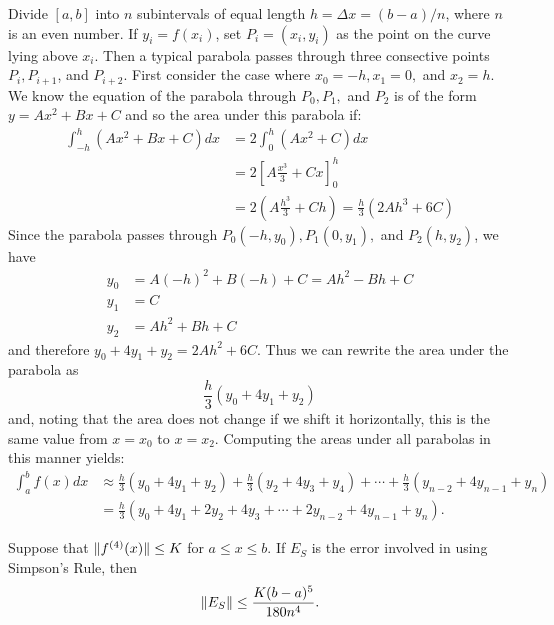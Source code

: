 \documentclass[a4paper,11pt]{article}
\begin{document}
\begin{outline}
    \begin{justification}
      Divide \([a,b]\) into \(n\) subintervals of equal length \(h = \Delta{x} = (b-a)/n\), where \(n\) is an even number.
      If \(y_i = f(x_i)\), set \(P_i = (x_i, y_i)\) as the point on the curve lying above \(x_i\). Then a typical 
      parabola passes through three consective points \(P_i, P_{i+1}\), and \(P_{i+2}\). First consider the case
      where \(x_0 = -h, x_1 = 0,\) and \(x_2 = h\). We know the equation of the parabola through \(P_0, P_1,\) and \(P_2\)
      is of the form \(y = Ax^2 + Bx + C\) and so the area under this parabola if:
      \begin{align*}
        \int_{-h}^h (Ax^2+Bx+C)dx &= 2\int_0^h (Ax^2 + C) dx \\
                                  &= 2\left[ A\frac{x^3}{3} + Cx\right]_0^h \\
                                  &= 2\left( A\frac{h^3}{3} + Ch\right) = \frac{h}{3}(2Ah^3 + 6C)
      \end{align*}
      Since the parabola passes through \(P_0(-h, y_0), P_1(0, y_1),\) and \(P_2(h,y_2)\), we have
      \begin{align*}
        y_0 &= A(-h)^2 + B(-h) + C = Ah^2 - Bh + C \\
        y_1 &= C \\
        y_2 &= Ah^2 + Bh + C
      \end{align*}
      and therefore \(y_0 + 4y_1 + y_2 = 2Ah^2 + 6C\).
      Thus we can rewrite the area under the parabola as \[ \frac{h}{3}(y_0 + 4y_1 + y_2) \] and, noting that the area
      does not change if we shift it horizontally, this is the same value from \(x=x_0\) to \(x = x_2\).
      Computing the areas under all parabolas in this manner yields:
      \begin{align*}
        \int_a^bf(x)dx &\approx \frac{h}{3}(y_0+4y_1+y_2) + \frac{h}{3}(y_2+4y_3+y_4) + \cdots + 
                                \frac{h}{3}(y_{n-2}+4y_{n-1}+y_n) \\
                       &= \frac{h}{3}(y_0 + 4y_1 + 2y_2 + 4y_3 + \cdots + 2y_{n-2} + 4y_{n-1} + y_n)\text{.}
      \end{align*}
    \end{justification}
    
    Suppose that \(\|f^{(4)}(x)\| \leq K\) for \(a \leq x \leq b\). If \(E_S\) is the error involved in using
    Simpson's Rule, then \[ \|E_S\| \leq \frac{K(b-a)^5}{180n^4}\text{.} \]
    

\end{outline}
\end{document}

